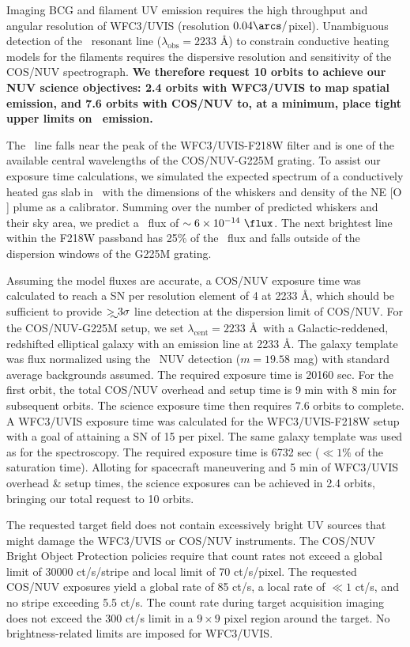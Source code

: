 \documentclass[12pt]{article}
\begin{document}
 Imaging BCG and filament UV emission requires the
high throughput and angular resolution of WFC3/UVIS (resolution
$0.04\arcs/$pixel). Unambiguous detection of the \civ\ resonant line
($\lambda_{\mathrm{obs}} = 2233$ \AA) to constrain conductive heating
models for the filaments requires the dispersive resolution and
sensitivity of the COS/NUV spectrograph. {\bf{We therefore request 10
    orbits to achieve our NUV science objectives: 2.4 orbits with
    WFC3/UVIS to map spatial emission, and 7.6 orbits with COS/NUV to,
    at a minimum, place tight upper limits on \civ\ emission.}}

The \civ\ line falls near the peak of the WFC3/UVIS-F218W filter and
is one of the available central wavelengths of the COS/NUV-G225M
grating. To assist our exposure time calculations, we simulated the
expected spectrum of a conductively heated gas slab in \cloudy\ with
the dimensions of the whiskers and density of the NE [O ]
plume as a calibrator. Summing over the number of predicted whiskers
and their sky area, we predict a \civ\ flux of $\sim 6\times10^{-14}
~\flux$. The next brightest line within the F218W passband has 25\% of
the \civ\ flux and falls outside of the dispersion windows of the
G225M grating.

Assuming the model fluxes are accurate, a COS/NUV exposure time was
calculated to reach a SN per resolution element of 4 at 2233 \AA,
which should be sufficient to provide $\ga 3\sigma$ line detection at
the dispersion limit of COS/NUV. For the COS/NUV-G225M setup, we set
$\lambda_{\mathrm{cent}} = 2233$ \AA\ with a Galactic-reddened,
redshifted elliptical galaxy with an emission line at 2233 \AA. The
galaxy template was flux normalized using the \galex\ NUV detection
($m = 19.58$ mag) with standard average backgrounds assumed. The
required exposure time is 20160 sec. For the first orbit, the total
COS/NUV overhead and setup time is 9 min with 8 min for subsequent
orbits. The science exposure time then requires 7.6 orbits to
complete. A WFC3/UVIS exposure time was calculated for the
WFC3/UVIS-F218W setup with a goal of attaining a SN of 15 per
pixel. The same galaxy template was used as for the spectroscopy. The
required exposure time is 6732 sec ($\ll 1\%$ of the saturation
time). Alloting for spacecraft maneuvering and 5 min of WFC3/UVIS
overhead \& setup times, the science exposures can be achieved in 2.4
orbits, bringing our total request to 10 orbits.

The requested target field does not contain excessively bright UV
sources that might damage the WFC3/UVIS or COS/NUV instruments. The
COS/NUV Bright Object Protection policies require that count rates not
exceed a global limit of 30000 ct/s/stripe and local limit of 70
ct/s/pixel. The requested COS/NUV exposures yield a global rate of 85
ct/s, a local rate of $\ll 1$ ct/s, and no stripe exceeding 5.5
ct/s. The count rate during target acquisition imaging does not exceed
the 300 ct/s limit in a $9 \times 9$ pixel region around the
target. No brightness-related limits are imposed for WFC3/UVIS.
\end{document}
